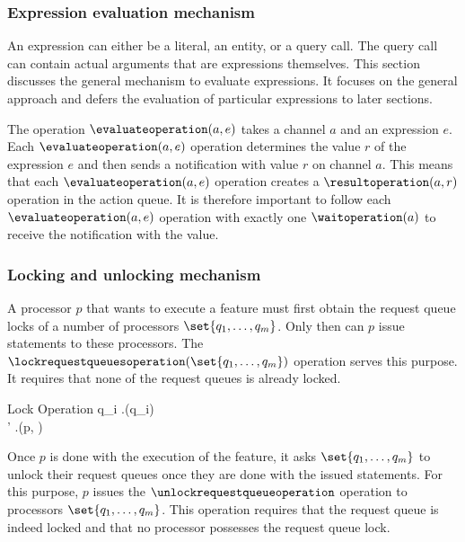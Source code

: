\subsubsection{Expression evaluation mechanism}\label{sec:expression evaluation mechanism}
An expression can either be a literal, an entity, or a query call. The query call can contain actual arguments that are expressions themselves. This section discusses the general mechanism to evaluate expressions. It focuses on the general approach and defers the evaluation of particular expressions to later sections.

The operation $\evaluateoperation(a, e)$ takes a channel $a$ and an expression $e$. Each $\evaluateoperation(a, e)$ operation determines the value $r$ of the expression $e$ and then sends a notification with value $r$ on channel $a$. This means that each $\evaluateoperation(a, e)$ operation creates a $\resultoperation(a, r)$ operation in the action queue. It is therefore important to follow each $\evaluateoperation(a, e)$ operation with exactly one $\waitoperation(a)$ to receive the notification with the value.
\subsubsection{Locking and unlocking mechanism}
A processor $p$ that wants to execute a feature must first obtain the request queue locks of a number of processors $\set{q_{1}, \ldots, q_{m}}$. Only then can $p$ issue statements to these processors. The $\lockrequestqueuesoperation(\set{q_{1}, \ldots, q_{m}})$ operation serves this purpose. It requires that none of the request queues is already locked.

\singlelineinferencerule
	{Lock Operation}
	{
		\neg \exists q_{i} \in {} \colon \state.\isrequestqueuelockedfeature(q_{i}) \\
		\state' \mathematicaldefinition \state.\lockrequestqueuesfeature(p, )
	}
	{}
	{}
 
Once $p$ is done with the execution of the feature, it asks $\set{q_{1}, \ldots, q_{m}}$ to unlock their request queues once they are done with the issued statements. For this purpose, $p$ issues the $\unlockrequestqueueoperation$ operation to processors $\set{q_{1}, \ldots, q_{m}}$. This operation requires that the request queue is indeed locked and that no processor possesses the request queue lock.

